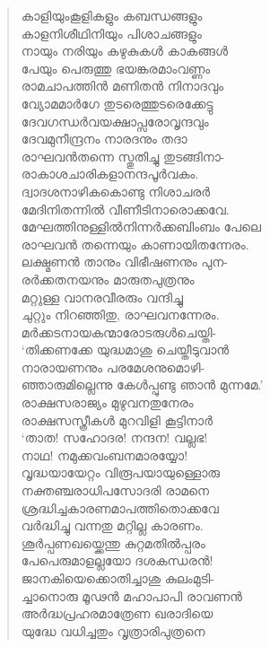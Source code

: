 \begin{verse}
കാളിയുംകൂളികളും കബന്ധങ്ങളും\\
കാളനിശീഥിനിയും പിശാചങ്ങളും\\
നായും നരിയും കഴുകുകള്‍ കാകങ്ങള്‍\\
പേയും പെരുത്തു ഭയങ്കരമാംവണ്ണം\\
രാമചാപത്തിന്‍ മണിതന്‍ നിനാദവും\\
വ്യോമമാര്‍ഗേ തുടരെത്തുടരെക്കേട്ടു\\
ദേവഗന്ധര്‍വയക്ഷാപ്സരോവൃന്ദവും\\
ദേവമുനീന്ദ്രനം നാരദനും തദാ\\
രാഘവന്‍തന്നെ സ്തുതിച്ചു തുടങ്ങിനാ-\\
രാകാശചാരികളാനന്ദപൂര്‍വകം.\\
ദ്വാദശനാഴികകൊണ്ടു നിശാചരര്‍\\
മേദിനിതന്നില്‍ വീണീടിനാരൊക്കവേ.\\
മേഘത്തിനുള്ളില്‍നിന്നര്‍ക്കബിംബം പേലെ\\
രാഘവന്‍ തന്നെയും കാണായിതന്നേരം.\\
ലക്ഷ്മണന്‍ താനും വിഭീഷണനും പുന-\\
രര്‍ക്കതനയനും മാരുതപുത്രനും\\
മറ്റുള്ള വാനരവീരരും വന്ദിച്ചു\\
ചുറ്റും നിറഞ്ഞിതു, രാഘവനന്നേരം.\\
മര്‍ക്കടനായകന്മാരോടരുള്‍ചെയ്തി-\\
‘തിക്കണക്കേ യുദ്ധമാശു ചെയ്തീടുവാന്‍\\
നാരായണനും പരമേശനുമൊഴി-\\
ഞ്ഞാരുമില്ലെന്നു കേള്‍പ്പുണ്ടു ഞാന്‍ മുന്നമേ.’\\
രാക്ഷസരാജ്യം മുഴുവനതുനേരം\\
രാക്ഷസസ്ത്രീകള്‍ മുറവിളി കൂട്ടിനാര്‍\\
‘താത! സഹോദര! നന്ദന! വല്ലഭ!\\
നാഥ! നമുക്കവംബനമാരയ്യോ!\\
വൃദ്ധയായേറ്റം വിരൂപയായുള്ളൊരു\\
നക്തഞ്ചരാധിപസോദരി രാമനെ\\
ശ്രദ്ധിച്ചകാരണമാപത്തിതൊക്കവേ\\
വര്‍ദ്ധിച്ചു വന്നതു മറ്റില്ല കാരണം.\\
ശൂര്‍പ്പണഖയ്ക്കെന്തു കുറ്റമതില്‍പ്പരം\\
പേപെരുമാളല്ലയോ ദശകന്ധരന്‍!\\
ജാനകിയെക്കൊതിച്ചാശു കുലംമുടി-\\
ച്ചാനൊരു മൂഢന്‍ മഹാപാപി രാവണന്‍\\
അര്‍ദ്ധപ്രഹരമാത്രേണ ഖരാദിയെ\\
യുദ്ധേ വധിച്ചതും വൃത്രാരിപുത്രനെ\\

\end{verse}
